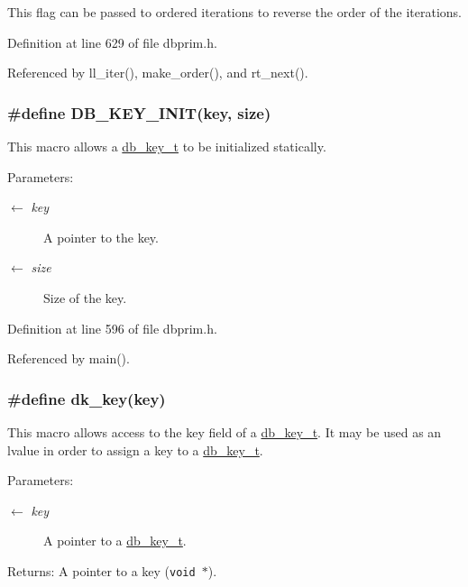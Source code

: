This flag can be passed to ordered iterations to reverse the order of the iterations.

Definition at line 629 of file dbprim.h.

Referenced by ll\_\-iter(), make\_\-order(), and rt\_\-next().\hypertarget{group__dbprim_ga1}{
\subsubsection[DB\_\-KEY\_\-INIT]{\setlength{\rightskip}{0pt plus 5cm}\#define DB\_\-KEY\_\-INIT(key, size)}}
\label{group__dbprim_ga1}


This macro allows a \hyperlink{group__dbprim_ga0}{db\_\-key\_\-t} to be initialized statically.

\begin{Desc}
\item[Parameters:]
\begin{description}
\item[\mbox{$\leftarrow$} {\em key}]A pointer to the key. \item[\mbox{$\leftarrow$} {\em size}]Size of the key.\end{description}
\end{Desc}


Definition at line 596 of file dbprim.h.

Referenced by main().\hypertarget{group__dbprim_ga2}{
\subsubsection[dk\_\-key]{\setlength{\rightskip}{0pt plus 5cm}\#define dk\_\-key(key)}}
\label{group__dbprim_ga2}


This macro allows access to the key field of a \hyperlink{group__dbprim_ga0}{db\_\-key\_\-t}. It may be used as an lvalue in order to assign a key to a \hyperlink{group__dbprim_ga0}{db\_\-key\_\-t}.

\begin{Desc}
\item[Parameters:]
\begin{description}
\item[\mbox{$\leftarrow$} {\em key}]A pointer to a \hyperlink{group__dbprim_ga0}{db\_\-key\_\-t}.\end{description}
\end{Desc}
\begin{Desc}
\item[Returns:]A pointer to a key ({\tt void $\ast$}).\end{Desc}


